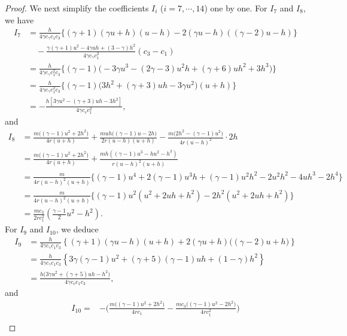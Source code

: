 \documentclass[11pt,reqno]{article}
\numberwithin{equation}{section}
\begin{document}
\begin{proof}
We next simplify the coefficients $I_{i}$ ($i=7,\cdots, 14$) one by one. For $I_{7}$ and $I_{8}$, we have
\begin{align*}
I_{7}
&= \frac{h}{4\gamma c_\gamma c_1 c_3} \Big\{ (\gamma+1)(\gamma u+h)(u-h) - 2(\gamma u-h)((\gamma-2)u-h) \Big\} \\
&\quad - \frac{\gamma(\gamma+1)u^{2}-4\gamma uh+(3-\gamma)h^{2}}{4\gamma c_\gamma c_1^2} ( c_3 - c_1  ) \\
&= \frac{h}{4\gamma c_\gamma c_1^2 c_3} \Big\{  (\gamma-1) \big( -3\gamma u^3 - (2\gamma-3)u^2 h + (\gamma+6)uh^2 + 3h^3 \big) \Big\} \\
&= \frac{h}{4\gamma c_\gamma c_1^2 c_3} \Big\{ (\gamma-1) \big( 3h^2 + (\gamma+3)u h -3\gamma u^2  \big)(u+h) \Big\} \\
&= -\frac{h[ 3\gamma u^2-(\gamma+3)u h-3h^2  ]}{4\gamma c_v c_1^2 },
\end{align*}
and
\begin{align*}
I_{8}
&= \frac{m\big((\gamma-1)u^{2}+2h^{2}\big)}{4r (u+h)}
   + \frac{m u h\big((\gamma-1)u-2h\big)}{2r (u-h)(u+h)}
  - \frac{m\big(2h^{2}-(\gamma-1)u^{2}\big)}{4r(u-h)^{2}}
   \cdot 2h \\
&=\frac{m\big((\gamma-1)u^{2}+2h^{2}\big)}{4r (u+h)}
   +\frac{mh((\gamma-1)u^3 - hu^2 - h^3)}{r(u-h)^2(u+h)}\\
&=\frac{m}{4r(u-h)^2(u+h)} \Big\{ (\gamma - 1)u^4 + 2(\gamma - 1)u^3 h + (\gamma - 1)u^2 h^2 - 2u^2 h^2 - 4u h^3 - 2h^4 \Big\} \\
&=\frac{m}{4r(u-h)^2(u+h)} \Big\{  (\gamma-1)u^2(u^2+2uh+h^2)-2h^2(u^2+2uh+h^2) \Big\} \\
&= \frac{mc_3}{2rc_1^{2}}\left(\frac{\gamma-1}{2}u^{2} - h^{2}\right).
\end{align*}
For $I_{9}$ and $I_{10}$, we deduce
\begin{align*}
I_{9}
&=\frac{h}{4\gamma c_\gamma c_1 c_3} \left\{
      (\gamma+1)(\gamma u-h)(u+h)
      + 2(\gamma u+h)\big((\gamma-2)u+h\big)
    \right\} \\
&= \frac{h}{4\gamma c_\gamma c_1 c_3} \left\{
      3\gamma(\gamma-1)u^2 + (\gamma+5)(\gamma-1)u h + (1-\gamma)h^2
    \right\} \\
&= \frac{h\big(3\gamma u^2 + (\gamma+5)u h - h^2\big)}{4\gamma c_v c_1 c_3},
\end{align*}
and
\begin{align*}
I_{10}
=&-\bigg(\frac{m\big((\gamma-1)u^{2}+2h^{2}\big)}{4r c_1}- \frac{m c_3\big((\gamma-1)u^{2}-2h^{2}\big)}{4r c_1^2}\bigg) \\
&

\end{align*}
\end{proof}
\end{document}
